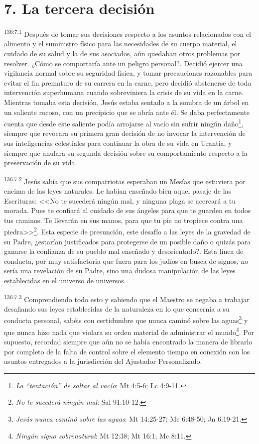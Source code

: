 \section*{7. La tercera decisión}
\par 
\textsuperscript{136:7.1} Después de tomar sus decisiones respecto a los asuntos relacionados con el alimento y el suministro físico para las necesidades de su cuerpo material, el cuidado de su salud y la de sus asociados, aún quedaban otros problemas por resolver. ¿Cómo se comportaría ante un peligro personal?. Decidió ejercer una vigilancia normal sobre su seguridad física, y tomar precauciones razonables para evitar el fin prematuro de su carrera en la carne, pero decidió abstenerse de toda intervención superhumana cuando sobreviniera la crisis de su vida en la carne. Mientras tomaba esta decisión, Jesús estaba sentado a la sombra de un árbol en un saliente rocoso, con un precipicio que se abría ante él. Se daba perfectamente cuenta que desde este saliente podía arrojarse al vacío sin sufrir ningún daño\footnote{\textit{La ``tentación'' de saltar al vacío}: Mt 4:5-6; Lc 4:9-11.}, siempre que revocara su primera gran decisión de no invocar la intervención de sus inteligencias celestiales para continuar la obra de su vida en Urantia, y siempre que anulara su segunda decisión sobre su comportamiento respecto a la preservación de su vida.

\par 
\textsuperscript{136:7.2} Jesús sabía que sus compatriotas esperaban un Mesías que estuviera por encima de las leyes naturales. Le habían enseñado bien aquel pasaje de las Escrituras: <<No te sucederá ningún mal, y ninguna plaga se acercará a tu morada. Pues te confiará al cuidado de sus ángeles para que te guarden en todos tus caminos. Te llevarán en sus manos, para que tu pie no tropiece contra una piedra>>\footnote{\textit{No te sucederá ningún mal}: Sal 91:10-12.}. Esta especie de presunción, este desafío a las leyes de la gravedad de su Padre, ¿estarían justificados para protegerse de un posible daño o quizás para ganarse la confianza de su pueblo mal enseñado y desorientado?. Esta línea de conducta, por muy satisfactoria que fuera para los judíos en busca de signos, no sería una revelación de su Padre, sino una dudosa manipulación de las leyes establecidas en el universo de universos.

\par 
\textsuperscript{136:7.3} Comprendiendo todo esto y sabiendo que el Maestro se negaba a trabajar desafiando sus leyes establecidas de la naturaleza en lo que concernía a su conducta personal, sabéis con certidumbre que nunca caminó sobre las aguas\footnote{\textit{Jesús nunca caminó sobre las aguas}: Mt 14:25-27; Mc 6:48-50; Jn 6:19-21.} y que nunca hizo nada que violara su orden material de administrar el mundo\footnote{\textit{Ningún signo sobrenatural}: Mt 12:38; Mt 16:1; Mc 8:11.}. Por supuesto, recordad siempre que aún no se había encontrado la manera de librarlo por completo de la falta de control sobre el elemento tiempo en conexión con los asuntos entregados a la jurisdicción del Ajustador Personalizado.

